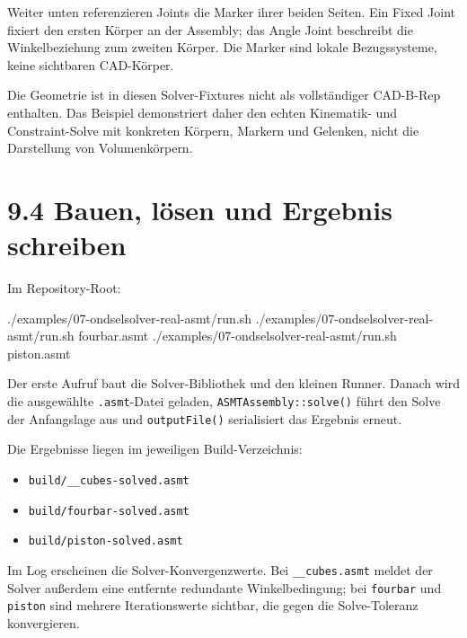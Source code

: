\documentclass[
  12pt
]{book}
\newenvironment{Shaded}{}{}
\newcommand{\ExtensionTok}[1]{#1}
\newcommand{\NormalTok}[1]{#1}
\providecommand{\tightlist}{%
  \setlength{\itemsep}{0pt}\setlength{\parskip}{0pt}}
\begin{document}
Weiter unten referenzieren Joints die Marker ihrer beiden Seiten. Ein
Fixed Joint fixiert den ersten Körper an der Assembly; das Angle Joint
beschreibt die Winkelbeziehung zum zweiten Körper. Die Marker sind
lokale Bezugssysteme, keine sichtbaren CAD-Körper.

Die Geometrie ist in diesen Solver-Fixtures nicht als vollständiger
CAD-B-Rep enthalten. Das Beispiel demonstriert daher den echten
Kinematik- und Constraint-Solve mit konkreten Körpern, Markern und
Gelenken, nicht die Darstellung von Volumenkörpern.

\hypertarget{bauen-luxf6sen-und-ergebnis-schreiben}{%
\section{\texorpdfstring{{9.4} Bauen, lösen und Ergebnis
schreiben}{9.4 Bauen, lösen und Ergebnis schreiben}}\label{bauen-luxf6sen-und-ergebnis-schreiben}}

Im Repository-Root:

\begin{Shaded}
\begin{Highlighting}[]
\ExtensionTok{./examples/07{-}ondselsolver{-}real{-}asmt/run.sh}
\ExtensionTok{./examples/07{-}ondselsolver{-}real{-}asmt/run.sh}\NormalTok{ fourbar.asmt}
\ExtensionTok{./examples/07{-}ondselsolver{-}real{-}asmt/run.sh}\NormalTok{ piston.asmt}
\end{Highlighting}
\end{Shaded}

Der erste Aufruf baut die Solver-Bibliothek und den kleinen Runner.
Danach wird die ausgewählte \texttt{.asmt}-Datei geladen,
\texttt{ASMTAssembly::solve()} führt den Solve der Anfangslage aus und
\texttt{outputFile()} serialisiert das Ergebnis erneut.

Die Ergebnisse liegen im jeweiligen Build-Verzeichnis:

\begin{itemize}
\tightlist
\item
  \texttt{build/\_\_cubes-solved.asmt}
\item
  \texttt{build/fourbar-solved.asmt}
\item
  \texttt{build/piston-solved.asmt}
\end{itemize}

Im Log erscheinen die Solver-Konvergenzwerte. Bei
\texttt{\_\_cubes.asmt} meldet der Solver außerdem eine entfernte
redundante Winkelbedingung; bei \texttt{fourbar} und \texttt{piston}
sind mehrere Iterationswerte sichtbar, die gegen die Solve-Toleranz
konvergieren.
\end{document}
